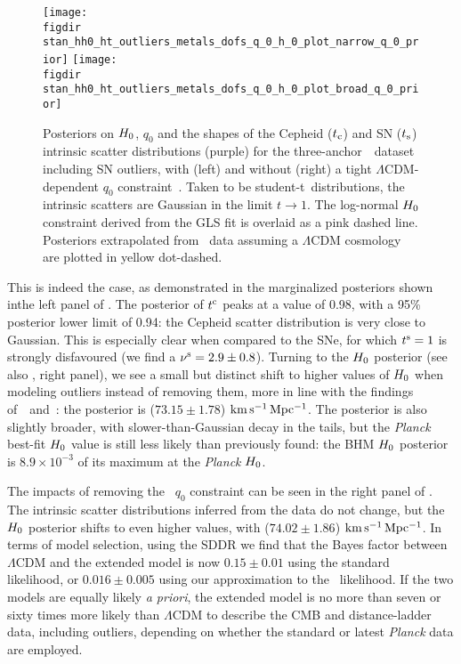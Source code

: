 \documentclass[a4paper,fleqn,usenatbib]{mnras}
\newcommand{\riess}{\citetalias{Riess_etal:2016}}
\newcommand{\tpeak}{t}
\newcommand{\studentdist}{student-t}
\newcommand{\decel}{\ensuremath{q_0}}
\newcommand{\dofs}{\ensuremath{\nu^{\rm s}}}
\newcommand{\tpeakc}{\ensuremath{\tpeak^{\rm c}}}
\newcommand{\tpeaks}{\ensuremath{\tpeak^{\rm s}}}
\newcommand{\kmsmpc}{\ensuremath{{\rm km\,s^{-1}\,Mpc^{-1}}}}
\begin{document}
{\begin{figure*}
\texttt{[image: \\figdir stan\_hh0\_ht\_outliers\_metals\_dofs\_q\_0\_h\_0\_plot\_narrow\_q\_0\_prior]}
\texttt{[image: \\figdir stan\_hh0\_ht\_outliers\_metals\_dofs\_q\_0\_h\_0\_plot\_broad\_q\_0\_prior]}
\caption{Posteriors on $H_0$, $\decel$ and the shapes of the Cepheid ($t_{\rm c}$) and SN ($t_{\rm s}$) intrinsic scatter distributions (purple) for the three-anchor~\protect\riess\ dataset including SN outliers, with (left) and without (right) a tight $\Lambda$CDM-dependent $\decel$ constraint~\citep{Betoule_etal:2014}. Taken to be \studentdist\ distributions, the intrinsic scatters are Gaussian in the limit $t \rightarrow 1$. The log-normal $H_0$ constraint derived from the GLS fit is overlaid as a pink dashed line. Posteriors extrapolated from~\citet{Planck_XIII:2016} data assuming a $\Lambda$CDM cosmology are plotted in yellow dot-dashed.}
\label{figure:ht_triangle}
\end{figure*}

This is indeed the case, as demonstrated in the marginalized posteriors shown inthe left panel of . The posterior of $\tpeakc$ peaks at a value of 0.98, with a 95\% posterior lower limit of 0.94: the Cepheid scatter distribution is very close to Gaussian. This is especially clear when compared to the SNe, for which $\tpeaks = 1$ is strongly disfavoured (we find a $\dofs = 2.9 \pm 0.8 $). Turning to the $H_0$ posterior (see also , right panel), we see a small but distinct shift to higher values of $H_0$ when modeling outliers instead of removing them, more in line with the findings of~\riess\ and~\citet{Cardona_etal:2016}: the posterior is ($73.15 \pm 1.78$) \kmsmpc. The posterior is also slightly broader, with slower-than-Gaussian decay in the tails, but the {\it Planck} best-fit $H_0$ value is still less likely than previously found: the BHM $H_0$ posterior is $8.9\times10^{-3}$ of its maximum at the {\it Planck} $H_0$.

The impacts of removing the~\citet{Betoule_etal:2014} $\decel$ constraint can be seen in the right panel of . The intrinsic scatter distributions inferred from the data do not change, but the $H_0$ posterior shifts to even higher values, with ($74.02 \pm 1.86$) \kmsmpc. In terms of model selection, using the SDDR we find that the Bayes factor between $\Lambda$CDM and the extended model is now $0.15 \pm 0.01$ using the standard~\citet{Planck_XIII:2016} likelihood, or $0.016 \pm 0.005$ using our approximation to the~\citet{Planck_Int_XLVI:2016} likelihood. If the two models are equally likely {\it a priori}, the extended model is no more than seven or sixty times more likely than $\Lambda$CDM to describe the CMB and distance-ladder data, including outliers, depending on whether the standard or latest {\it Planck} data are employed.

}
\end{document}
